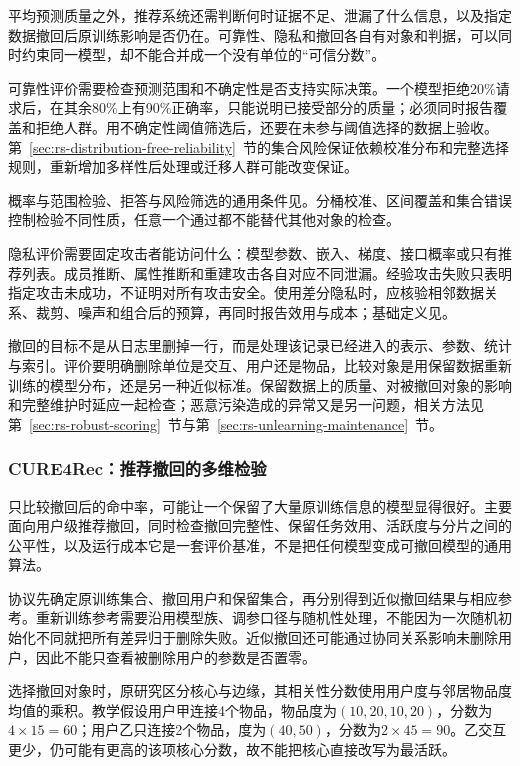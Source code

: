 平均预测质量之外，推荐系统还需判断何时证据不足、泄漏了什么信息，以及指定数据撤回后原训练影响是否仍在。可靠性、隐私和撤回各自有对象和判据，可以同时约束同一模型，却不能合并成一个没有单位的“可信分数”。

可靠性评价需要检查预测范围和不确定性是否支持实际决策。一个模型拒绝20\%请求后，在其余80\%上有90\%正确率，只能说明已接受部分的质量；必须同时报告覆盖和拒绝人群。用不确定性阈值筛选后，还要在未参与阈值选择的数据上验收。第~\ref{sec:rs-distribution-free-reliability}~节的集合风险保证依赖校准分布和完整选择规则，重新增加多样性后处理或迁移人群可能改变保证。

概率与范围检验、拒答与风险筛选的通用条件见。分桶校准、区间覆盖和集合错误控制检验不同性质，任意一个通过都不能替代其他对象的检查。

隐私评价需要固定攻击者能访问什么：模型参数、嵌入、梯度、接口概率或只有推荐列表。成员推断、属性推断和重建攻击各自对应不同泄漏。经验攻击失败只表明指定攻击未成功，不证明对所有攻击安全。使用差分隐私时，应核验相邻数据关系、裁剪、噪声和组合后的预算，再同时报告效用与成本；基础定义见。

撤回的目标不是从日志里删掉一行，而是处理该记录已经进入的表示、参数、统计与索引。评价要明确删除单位是交互、用户还是物品，比较对象是用保留数据重新训练的模型分布，还是另一种近似标准。保留数据上的质量、对被撤回对象的影响和完整维护时延应一起检查；恶意污染造成的异常又是另一问题，相关方法见第~\ref{sec:rs-robust-scoring}~节与第~\ref{sec:rs-unlearning-maintenance}~节。

\Needspace{100mm}
\subsubsection{CURE4Rec：推荐撤回的多维检验}
\label{sec:rs-evaluation-cure4rec}

只比较撤回后的命中率，可能让一个保留了大量原训练信息的模型显得很好。主要面向用户级推荐撤回，同时检查撤回完整性、保留任务效用、活跃度与分片之间的公平性，以及运行成本它是一套评价基准，不是把任何模型变成可撤回模型的通用算法。

协议先确定原训练集合、撤回用户和保留集合，再分别得到近似撤回结果与相应参考。重新训练参考需要沿用模型族、调参口径与随机性处理，不能因为一次随机初始化不同就把所有差异归于删除失败。近似撤回还可能通过协同关系影响未删除用户，因此不能只查看被删除用户的参数是否置零。

选择撤回对象时，原研究区分核心与边缘，其相关性分数使用用户度与邻居物品度均值的乘积。教学假设用户甲连接4个物品，物品度为$(10,20,10,20)$，分数为$4\times15=60$；用户乙只连接2个物品，度为$(40,50)$，分数为$2\times45=90$。乙交互更少，仍可能有更高的该项核心分数，故不能把核心直接改写为最活跃。

